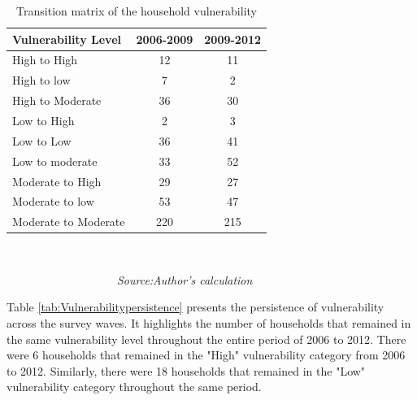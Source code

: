 \begin{table}[htb]
	\caption{Transition matrix of the household vulnerability}
\begin{center}
		\begin{tabular}{lcc} \hline
			\textbf{Vulnerability Level} & \textbf{2006-2009} & \textbf{2009-2012} \\ \hline
			High to High                 & 12                 & 11                 \\
			High to low                  & 7                  & 2                  \\
			High to Moderate             & 36                 & 30                 \\
			Low to High                  & 2                  & 3                  \\
			Low to Low                   & 36                 & 41                 \\
			Low to moderate              & 33                 & 52                 \\
			Moderate to High             & 29                 & 27                 \\
			Moderate to low              & 53                 & 47                 \\
			Moderate to Moderate         & 220                & 215       \\ \hline \hline        
		\end{tabular} \\
	\end{center}\vspace{-8pt}
	\textit{\ \ \ \ \ \ \ \ \ \ \ \ \ \ \ \ \ \ \ Source:Author's calculation}
	\label{tab:Vulnerabilitytransitions}	
\end{table}

Table \ref{tab:Vulnerabilitypersistence} presents the persistence of vulnerability across the survey waves. It highlights the number of households that remained in the same vulnerability level throughout the entire period of 2006 to 2012. There were 6 households that remained in the "High" vulnerability category from 2006 to 2012. Similarly, there were 18 households that remained in the "Low" vulnerability category throughout the same period.

